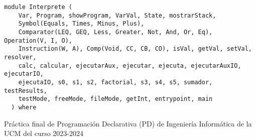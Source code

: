 \label{module:Interprete}
\haddockbeginheader
{\haddockverb\begin{verbatim}
module Interprete (
    Var, Program, showProgram, VarVal, State, mostrarStack,
    Symbol(Equals, Times, Minus, Plus),
    Comparator(LEQ, GEQ, Less, Greater, Not, And, Or, Eq), Operation(V, I, O),
    Instruction(W, A), Comp(Void, CC, CB, CO), isVal, getVal, setVal, resolver,
    calc, calcular, ejecutarAux, ejecutar, ejecuta, ejecutarAuxIO, ejecutarIO,
    ejecutaIO, s0, s1, s2, factorial, s3, s4, s5, sumador, testResults,
    testMode, freeMode, fileMode, getInt, entrypoint, main
  ) where\end{verbatim}}
\haddockendheader

Práctica final de Programación Declarativa (PD) de Ingeniería Informática de la UCM del curso 2023-2024\par
